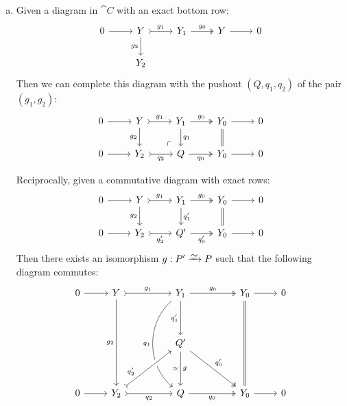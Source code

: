 \begin{theorem}
\begin{enumerate}[(a)]
\item Given a diagram in \(\cat C\) with an exact bottom row:
  \[
  \begin{tikzcd}
  0 \ar[r]
  &Y \ar[r, tail, "g_1"] \ar[d, "g_2"']
  &Y_1 \ar[r, two heads, "g_0"]
  &Y \ar[r]
  &0
  \\
  &Y_2 & & &
  \end{tikzcd}
  \]
  Then we can complete this diagram with the pushout \((Q, q_1, q_2)\) of the
  pair \((g_1, g_2)\):
  \[
  \begin{tikzcd}
  0 \ar[r]
  &Y \ar[d, "g_2"']
  \ar[r, "g_1", tail]
  &Y_1
  \ar[r, "g_0", two heads]
  \ar[d, "q_1"]
  &Y_0
  \ar[d, equals]
  \ar[r]
  &0
  \\
  0 \ar[r]
  &Y_2 \ar[r, tail, "q_2"']
  &Q \ar[r, two heads, "q_0"']
  \ar[ul, "\ulcorner", phantom, very near start]
  &Y_0 \ar[r]
  &0
  \end{tikzcd}
  \]

  Reciprocally, given a commutative diagram with exact rows:
  \[
  \begin{tikzcd}
  0 \ar[r]
  &Y \ar[d, "g_2"']
  \ar[r, "g_1", tail]
  &Y_1
  \ar[r, "g_0", two heads]
  \ar[d, "q_1'"]
  &Y_0
  \ar[d, equals]
  \ar[r]
  &0
  \\
  0 \ar[r]
  &Y_2 \ar[r, tail, "q_2'"']
  &Q' \ar[r, two heads, "q_0'"']
  &Y_0 \ar[r]
  &0
  \end{tikzcd}
  \]
  Then there exists an isomorphism \(g: P' \isoto P\) such that the following
  diagram commutes:
  \[
  \begin{tikzcd}
  0
  \ar[r]
  &Y
  \ar[rr, "g_1", tail]
  \ar[dddd, "g_2"']
  &
  &Y_1
  \ar[rr, "g_0", two heads]
  \ar[dddd, "q_1"', bend right=50]
  \ar[dd, "q_1'"']
  &
  &Y_0
  \ar[dddd, equals]
  \ar[r]
  &0
  \\
  &
  &
  &
  &
  &
  &
  \\
  &
  &
  &Q'
  \ar[dd, "g", "\dis"']
  \ar[ddrr, "q_0'", two heads]
  &
  &
  &
  \\
  &
  &
  &
  &
  \\
  0
  \ar[r]
  &Y_2
  \ar[rr, tail, "q_2"']
  \ar[rruu, tail, "q_2'", near start, crossing over]
  &
  &Q
  \ar[rr, two heads, "q_0"']
  &
  &Y_0
  \ar[r]
  &0
  \end{tikzcd}
  \]
\end{enumerate}
\end{theorem}

